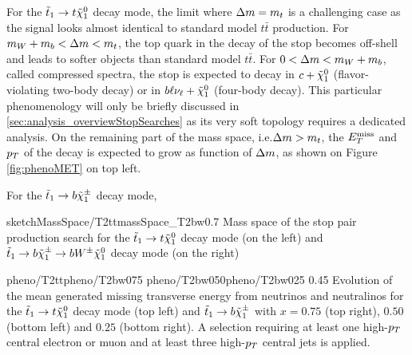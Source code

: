         For the $\tilde{t}_1 \rightarrow t \tilde{\chi}_1^0$ decay mode, the limit where
        $\Delta m = m_{t}$ is a challenging case as the signal looks almost identical
        to standard model $t\bar{t}$ production. For $m_{W} + m_{b} < \Delta m < m_{t}$,
        the top quark in the decay of the stop becomes off-shell and leads to softer objects
        than standard model $t\bar{t}$. For $0 < \Delta m < m_{W} + m_{b}$, called
        compressed spectra, the stop is expected to decay in $c+\tilde{\chi}_1^0$
        (flavor-violating two-body decay) or in $b\ell\nu_\ell+\tilde{\chi}_1^0$ (four-body
        decay). This particular phenomenology will only be briefly discussed in
        \ref{sec:analysis_overviewStopSearches} as its very soft topology requires a
        dedicated analysis. On the remaining part of the mass space, i.e.$\Delta m > m_{t}$,
        the $E_T^\text{miss}$ and $p_T$ of the decay is expected to grow as function of $\Delta m$,
        as shown on Figure \ref{fig:phenoMET} on top left.

        For the $\tilde{t}_1 \rightarrow b \tilde{\chi}_1^\pm$ decay mode, 

                     {sketchMassSpace/T2tt}{massSpace_T2bw}{0.7}
                     {Mass space of the stop pair production search for the $\tilde{t}_1
                     \rightarrow t \tilde{\chi}_1^0$ decay mode (on the left) and $\tilde{t}_1
                     \rightarrow b \tilde{\chi}_1^\pm \rightarrow b W^{\pm} \tilde{\chi}_1^0 $ decay
                     mode (on the right) }

                     {pheno/T2tt}{pheno/T2bw075}
                     {pheno/T2bw050}{pheno/T2bw025}
                     {0.45}
                     {Evolution of the mean generated missing transverse energy from neutrinos
                     and neutralinos for the $\tilde{t}_1 \rightarrow t \tilde{\chi}_1^0$
                     decay mode (top left) and $\tilde{t}_1 \rightarrow b \tilde{\chi}_1^\pm$ with
                     $x = 0.75$ (top right), $0.50$ (bottom left) and $0.25$ (bottom right).
                     A selection requiring at least one high-$p_T$ central
                     electron or muon and at least three high-$p_T$ central jets is applied.}

